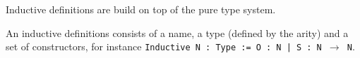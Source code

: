 Inductive definitions are build on top of the pure type system.
\begin{defi}
  An inductive definitions consists of a name, a type (defined by the arity)
  and a set of constructors, for instance \texttt{Inductive N : Type := O : N |
    S : N $\rightarrow$ N}.
\end{defi}





